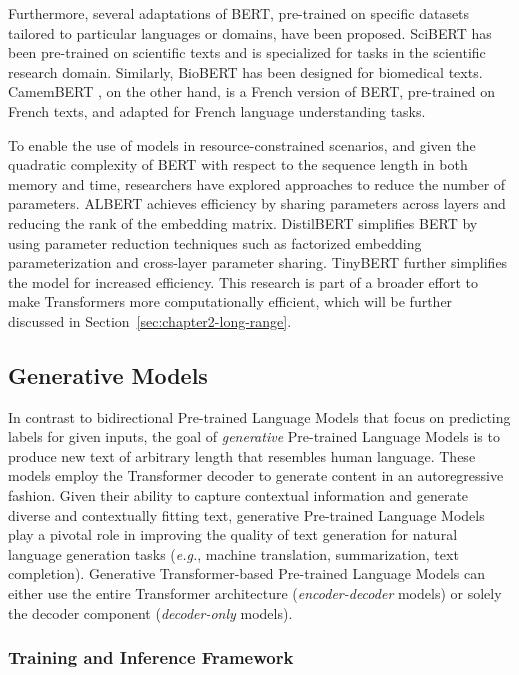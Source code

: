 Furthermore, several adaptations of \ac{BERT}, pre-trained on specific datasets tailored to particular languages or domains, have been proposed. SciBERT \citep{beltagy2019scibert} has been pre-trained on scientific texts and is specialized for tasks in the scientific research domain. Similarly, BioBERT \citep{lee2020biobert} has been designed for biomedical texts. CamemBERT \citep{martin2019camembert}, on the other hand, is a French version of \ac{BERT}, pre-trained on French texts, and adapted for French language understanding tasks.

To enable the use of models in resource-constrained scenarios, and given the quadratic complexity of \ac{BERT} with respect to the sequence length in both memory and time, researchers have explored approaches to reduce the number of parameters. \ac{ALBERT} achieves efficiency by sharing parameters across layers and reducing the rank of the embedding matrix. DistilBERT \citep{sanh2019distilbert} simplifies \ac{BERT} by using parameter reduction techniques such as factorized embedding parameterization and cross-layer parameter sharing. TinyBERT \citep{jiao2019tinybert} further simplifies the model for increased efficiency. This research is part of a broader effort to make Transformers more computationally efficient, which will be further discussed in Section~\ref{sec:chapter2-long-range}.

\subsection{Generative Models} 

In contrast to bidirectional Pre-trained Language Models that focus on predicting labels for given inputs, the goal of \textit{generative} Pre-trained Language Models is to produce new text of arbitrary length that resembles human language. These models employ the Transformer decoder to generate content in an autoregressive fashion. Given their ability to capture contextual information and generate diverse and contextually fitting text, generative Pre-trained Language Models play a pivotal role in improving the quality of text generation for natural language generation tasks (\textit{e.g.}, machine translation, summarization, text completion). Generative Transformer-based Pre-trained Language Models can either use the entire Transformer architecture (\textit{encoder-decoder} models) or solely the decoder component (\textit{decoder-only} models).

\subsubsection{Training and Inference Framework}

